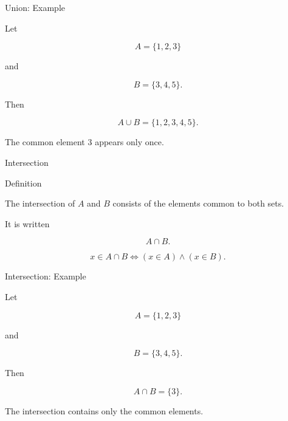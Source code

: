 \documentclass[aspectratio=169,11pt]{beamer}
\begin{document}

\begin{frame}{Union: Example}

Let

\[
A=\{1,2,3\}
\]

and

\[
B=\{3,4,5\}.
\]

Then

\[
\boxed{
A\cup B=\{1,2,3,4,5\}.
}
\]

\vspace{0.3cm}

The common element $3$ appears only once.

\end{frame}


\begin{frame}{Intersection}

\begin{block}{Definition}

The intersection of $A$ and $B$ consists of the elements
common to both sets.

\end{block}

\vspace{0.35cm}

It is written

\[
\boxed{A\cap B}.
\]

\vspace{0.3cm}

\[
x\in A\cap B
\iff
(x\in A)\land(x\in B).
\]

\end{frame}


\begin{frame}{Intersection: Example}

Let

\[
A=\{1,2,3\}
\]

and

\[
B=\{3,4,5\}.
\]

Then

\[
\boxed{
A\cap B=\{3\}.
}
\]

\vspace{0.35cm}

The intersection contains only the common elements.

\end{frame}
\end{document}
